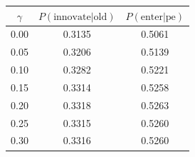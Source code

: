 \begin{tabular}{ccc}
\hline
$\gamma$ & $P(\text{innovate} | \text{old})$ & $P(\text{enter} | \text{pe})$ \\
\hline
0.00 & 0.3135 & 0.5061 \\
0.05 & 0.3206 & 0.5139 \\
0.10 & 0.3282 & 0.5221 \\
0.15 & 0.3314 & 0.5258 \\
0.20 & 0.3318 & 0.5263 \\
0.25 & 0.3315 & 0.5260 \\
0.30 & 0.3316 & 0.5260 \\
\hline
\end{tabular}